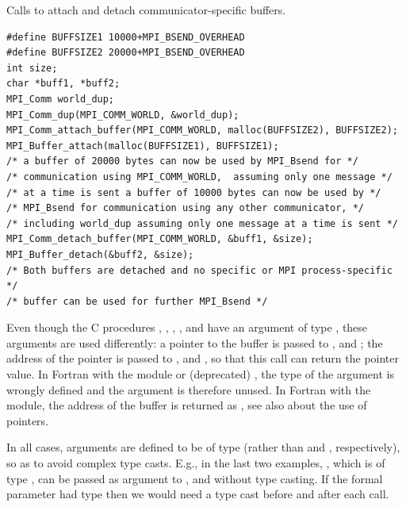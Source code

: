 \begin{example}
\label{pt2pt-exY}
%
Calls to attach and detach communicator-specific buffers.
\begin{lstlisting}[language={[MPI]C}]
#define BUFFSIZE1 10000+MPI_BSEND_OVERHEAD
#define BUFFSIZE2 20000+MPI_BSEND_OVERHEAD
int size;
char *buff1, *buff2;
MPI_Comm world_dup;
MPI_Comm_dup(MPI_COMM_WORLD, &world_dup);
MPI_Comm_attach_buffer(MPI_COMM_WORLD, malloc(BUFFSIZE2), BUFFSIZE2);
MPI_Buffer_attach(malloc(BUFFSIZE1), BUFFSIZE1);
/* a buffer of 20000 bytes can now be used by MPI_Bsend for */
/* communication using MPI_COMM_WORLD,  assuming only one message */
/* at a time is sent a buffer of 10000 bytes can now be used by */
/* MPI_Bsend for communication using any other communicator, */
/* including world_dup assuming only one message at a time is sent */
MPI_Comm_detach_buffer(MPI_COMM_WORLD, &buff1, &size);
MPI_Buffer_detach(&buff2, &size);
/* Both buffers are detached and no specific or MPI process-specific */
/* buffer can be used for further MPI_Bsend */
\end{lstlisting}
\end{example}

\begin{users}
Even though the C procedures
,
,
,
,
 and
have
an argument of type , these arguments are used
differently: a pointer to the buffer is passed to
,
 and
;
the address of the pointer is passed to
,
 and
, so that
this call can return the pointer value.
In Fortran with the  module or (deprecated) , the type of the  argument is
wrongly defined and the argument is therefore unused.
In Fortran with the  module, the address of the buffer is returned
as , see also
about the use of  pointers.
\end{users}

\begin{rationale}
In all cases, arguments are defined to be of type  (rather than
 and , respectively), so as to avoid complex type
casts. E.g., in the last two examples, , which is of type
, can be passed as argument to ,
 and
without type casting.  If the formal parameter had type  then we
would need a type cast before and after each call.
\end{rationale}


